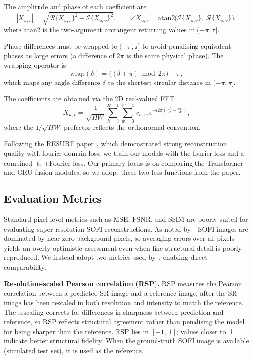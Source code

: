 The amplitude and phase of each coefficient are
\begin{equation}
  |X_{u,v}| = \sqrt{\mathcal{R}\{X_{u,v}\}^2 + \mathcal{I}\{X_{u,v}\}^2},
  \qquad
  \angle X_{u,v} = \mathrm{atan2}\!\bigl(\mathcal{I}\{X_{u,v}\},\,\mathcal{R}\{X_{u,v}\}\bigr),
  \label{eq:amp_phase}
\end{equation}
where $\mathrm{atan2}$ is the two-argument arctangent returning values in $(-\pi, \pi]$.

Phase differences must be wrapped to $(-\pi, \pi]$ to avoid penalising
equivalent phases as large errors (a difference of $2\pi$ is the same physical phase).
The wrapping operator is
\begin{equation}
  \mathrm{wrap}(\delta) = \bigl((\delta + \pi)\bmod 2\pi\bigr) - \pi,
  \label{eq:wrap}
\end{equation}
which maps any angle difference $\delta$ to the shortest circular distance
in $(-\pi, \pi]$.

The coefficients are obtained via the 2D real-valued FFT:
\begin{equation}
  X_{u,v} = \frac{1}{\sqrt{HW}}\sum_{h=0}^{H-1}\sum_{w=0}^{W-1}
  x_{h,w}\, e^{-i2\pi\!\left(\frac{uh}{H}+\frac{vw}{W}\right)},
  \label{eq:dft}
\end{equation}
where the $1/\sqrt{HW}$ prefactor reflects the orthonormal convention.

Following the RESURF paper~\cite{resurf2024}, which demonstrated strong
reconstruction quality with fourier domain loss, we train our models with
the fourier loss and a combined $\ell_1$+Fourier loss.
Our primary focus is on comparing the Transformer and GRU fusion modules,
so we adopt these two loss functions from the paper.

\subsection{Evaluation Metrics}
\label{ssec:metrics}

Standard pixel-level metrics such as MSE, PSNR, and SSIM are poorly suited for evaluating
super-resolution SOFI reconstructions. As noted by~\cite{jelle2024}, SOFI images are
dominated by near-zero background pixels, so averaging errors over all pixels yields an
overly optimistic assessment even when fine structural detail is poorly reproduced.
We instead adopt two metrics used by~\cite{resurf2024}, enabling direct comparability.

\textbf{Resolution-scaled Pearson correlation (RSP).}
RSP measures the Pearson correlation between a predicted SR image and a reference image,
after the SR image has been rescaled in both resolution and intensity to match the reference.
The rescaling corrects for differences in sharpness between prediction and reference, so
RSP reflects structural agreement rather than penalising the model for being sharper than
the reference. RSP lies in $[-1,\,1]$; values closer to~1 indicate better structural
fidelity. When the ground-truth SOFI image is available (simulated test set), it is used
as the reference.


